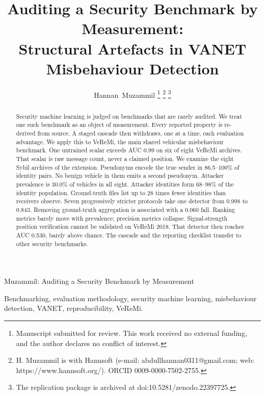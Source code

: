 \documentclass[journal,twoside]{IEEEtran}
\begin{document}
\title{Auditing a Security Benchmark by Measurement:\\
Structural Artefacts in VANET Misbehaviour Detection}

\author{Hannan~Muzammil%
\thanks{Manuscript submitted for review. This work received no external funding,
and the author declares no conflict of interest.}%
\thanks{H. Muzammil is with Hannsoft (e-mail: abdullhannan0311@gmail.com;
web: https://www.hannsoft.org/). ORCID 0009-0000-7502-2755.}%
\thanks{The replication package is archived at doi:10.5281/zenodo.22397725.}}

%
{Muzammil: Auditing a Security Benchmark by Measurement}
\maketitle

\begin{abstract}
Security machine learning is judged on benchmarks that are rarely audited.
We treat one such benchmark as an object of measurement.
Every reported property is re-derived from source.
A staged cascade then withdraws, one at a time, each evaluation advantage.
We apply this to VeReMi, the main shared vehicular misbehaviour benchmark.
One untrained scalar exceeds AUC 0.99 on six of eight VeReMi archives.
That scalar is raw message count, never a claimed position.
We examine the eight Sybil archives of the extension.
Pseudonyms encode the true sender in 86.5--100\% of identity pairs.
No benign vehicle in them emits a second pseudonym.
Attacker prevalence is 30.0\% of vehicles in all eight.
Attacker identities form 68--98\% of the identity population.
Ground-truth files list up to 28 times fewer identities than receivers observe.
Seven progressively stricter protocols take one detector from 0.998 to 0.843.
Removing ground-truth aggregation is associated with a 0.060 fall.
Ranking metrics barely move with prevalence; precision metrics collapse.
Signal-strength position verification cannot be validated on VeReMi 2018.
That detector then reaches AUC 0.530, barely above chance.
The cascade and the reporting checklist transfer to other security benchmarks.
\end{abstract}

\begin{IEEEkeywords}
Benchmarking, evaluation methodology, security machine learning, misbehaviour detection, VANET, reproducibility, VeReMi.
\end{IEEEkeywords}
\end{document}
